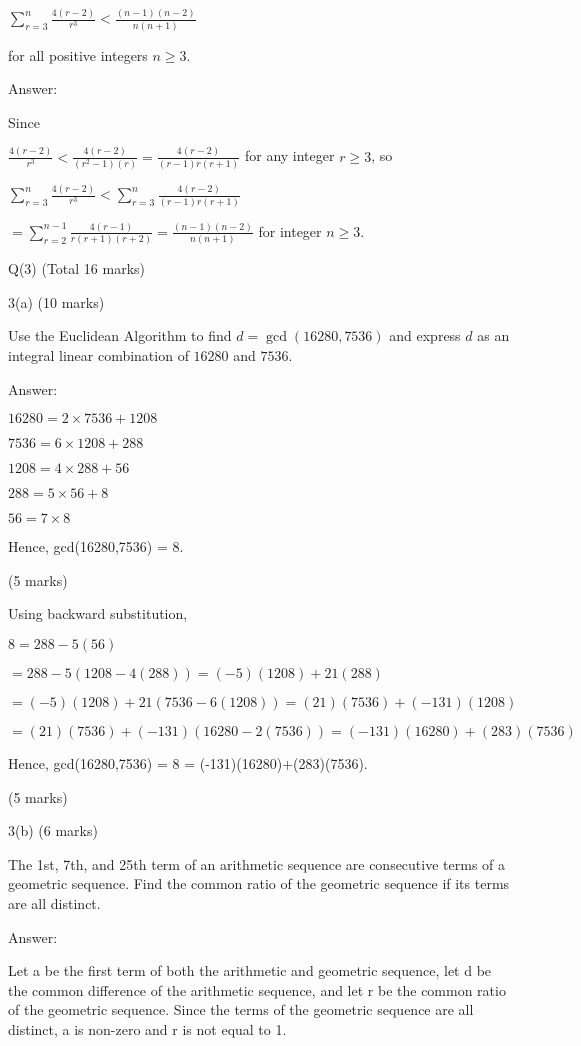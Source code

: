\documentclass[a4paper,12pt,oneside]{book}
\theoremstyle{definition}
\begin{document}
$\sum_{r=3}^n \frac{4(r-2)}{r^3} < \frac{(n-1)(n-2)}{n(n+1)}$

for all positive integers $n \geq 3$.

Answer:

Since 

$\frac{4(r-2)}{r^3} < \frac{4(r-2)}{(r^2-1)(r)} = \frac{4(r-2)}{(r-1)r(r+1)}$ for any integer $r \geq 3$, so

$\sum_{r=3}^n \frac{4(r-2)}{r^3} < \sum_{r=3}^n \frac{4(r-2)}{(r-1)r(r+1)}$

$ = \sum_{r=2}^{n-1} \frac{4(r-1)}{r(r+1)(r+2)} = \frac{(n-1)(n-2)}{n(n+1)}$ for integer $n \geq 3$.







\newpage

Q(3) (Total 16 marks)

3(a) (10 marks)

Use the Euclidean Algorithm to find $d=\gcd(16280,7536)$ and express $d$ as an integral linear combination of $16280$ and $7536$.

Answer:

$16280 = 2 \times 7536 + 1208$

$7536 = 6 \times 1208 + 288$

$1208 = 4 \times 288 + 56$

$288 = 5 \times 56 + 8$

$56 = 7 \times 8$

Hence, gcd(16280,7536) = 8.

(5 marks)

Using backward substitution,

$8 = 288 - 5(56)$

$= 288 - 5(1208-4(288)) = (-5)(1208)+21(288)$

$= (-5)(1208)+21(7536-6(1208)) = (21)(7536) + (-131)(1208)$

$= (21)(7536) + (-131)(16280-2(7536)) = (-131)(16280)+(283)(7536)$

Hence, gcd(16280,7536) = 8 = (-131)(16280)+(283)(7536).

(5 marks)

3(b) (6 marks)

The 1st, 7th, and 25th term of an arithmetic sequence are consecutive terms of a geometric sequence. Find the common ratio of the geometric sequence if its terms are all distinct.

Answer:

Let a be the first term of both the arithmetic and geometric sequence, let d be the common difference of the arithmetic sequence, and let r be the common ratio of the geometric sequence. Since the terms of the geometric sequence are all distinct, a is non-zero and r is not equal to 1.
\end{document}
